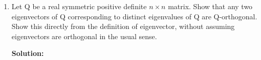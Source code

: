 \documentclass[conference,onecolumn]{IEEEtran}
\begin{document}
\begin{enumerate}
\begin{enumerate}
\begin{align*}
                              \begin{cases}
                                    \frac{d^2}{dt^2}f(\frac{1}{3})   & = 168 \cdot \frac{1}{3} + 2 = 60 > 0 \Rightarrow \text{local minimum}      \\
                                    \frac{d^2}{dt^2}f(-\frac{5}{14}) & = 168 \cdot (-\frac{5}{14}) + 2 = -50 < 0 \Rightarrow \text{local maximum}
                              \end{cases}
                        \end{align*}
                        Plug in the minimum point $t = \frac{1}{3}$ back we get:
                        \begin{align*}
                              \begin{cases}
                                    x = 1 + \frac{1}{3} = \frac{4}{3} \\
                                    y = -1 + 3 \cdot \frac{1}{3} = 0
                              \end{cases}
                        \end{align*}
                        Which corresponds to the local minimum we get in part (a).

                        With just 1 steepest descent step, we can converge to the local minimum.
                        Literally zero-shot local minimum!
            \end{enumerate}
            Please explain how you got your results and show your work.
            No code is needed or expected.

            \clearpage
      \item Let Q be a real symmetric positive definite $n \times n$ matrix.
            Show that any two eigenvectors of Q corresponding to distinct eigenvalues of Q are Q-orthogonal.
            Show this directly from the definition of eigenvector, without assuming eigenvectors are orthogonal in the usual sense.

            \textbf{Solution:}


\end{enumerate}
\end{document}
